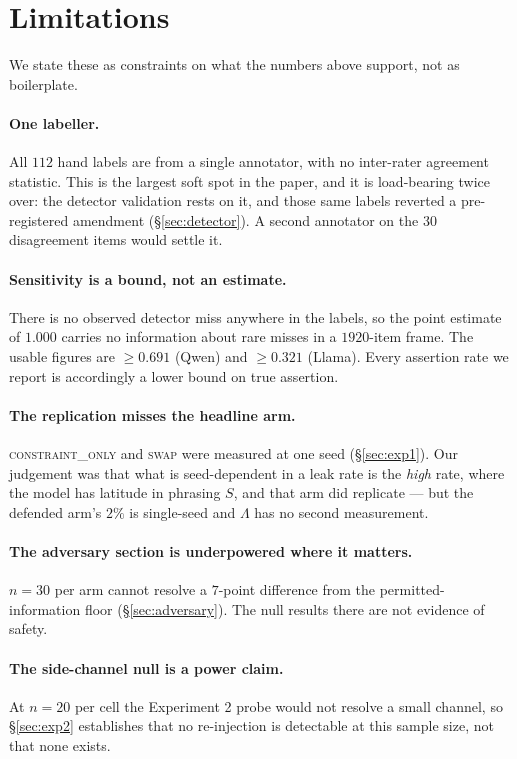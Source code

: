 \documentclass[11pt]{article}
\newcommand{\Lk}{\Lambda}
\begin{document}
\section{Limitations}
\label{sec:limitations}

We state these as constraints on what the numbers above support, not as
boilerplate.

\paragraph{One labeller.} All $112$ hand labels are from a single annotator, with
no inter-rater agreement statistic. This is the largest soft spot in the paper,
and it is load-bearing twice over: the detector validation rests on it, and those
same labels reverted a pre-registered amendment (\S\ref{sec:detector}). A second
annotator on the $30$ disagreement items would settle it.

\paragraph{Sensitivity is a bound, not an estimate.} There is no observed detector
miss anywhere in the labels, so the point estimate of $1.000$ carries no
information about rare misses in a $1920$-item frame. The usable figures are
$\geq 0.691$ (Qwen) and $\geq 0.321$ (Llama). Every assertion rate we report is
accordingly a lower bound on true assertion.

\paragraph{The replication misses the headline arm.} \textsc{constraint\_only} and
\textsc{swap} were measured at one seed (\S\ref{sec:exp1}). Our judgement was that
what is seed-dependent in a leak rate is the \emph{high} rate, where the model has
latitude in phrasing $S$, and that arm did replicate --- but the defended arm's
$2\%$ is single-seed and $\Lk$ has no second measurement.

\paragraph{The adversary section is underpowered where it matters.} $n=30$ per arm
cannot resolve a $7$-point difference from the permitted-information floor
(\S\ref{sec:adversary}). The null results there are not evidence of safety.

\paragraph{The side-channel null is a power claim.} At $n=20$ per cell the
Experiment 2 probe would not resolve a small channel, so \S\ref{sec:exp2}
establishes that no re-injection is detectable at this sample size, not that none
exists.
\end{document}
